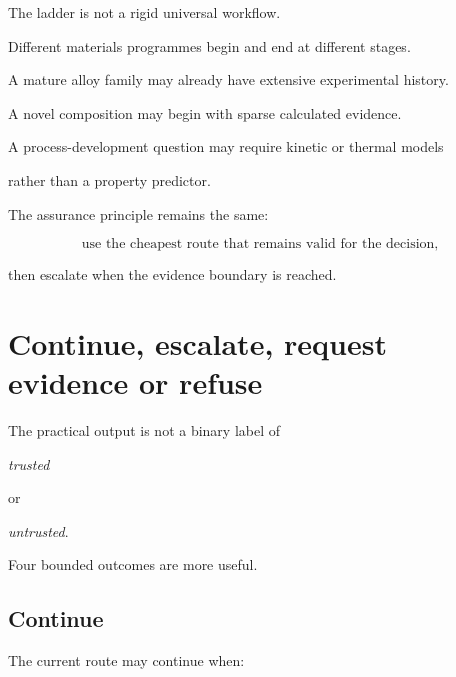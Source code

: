 \documentclass[11pt,a4paper,oneside]{report}
\begin{document}
The ladder is not a rigid universal workflow.



Different materials programmes begin and end at different stages.



A mature alloy family may already have extensive experimental history.



A novel composition may begin with sparse calculated evidence.



A process-development question may require kinetic or thermal models

rather than a property predictor.



The assurance principle remains the same:



\begin{equation}
\text{use the cheapest route that remains valid for the decision,}
\end{equation}



then escalate when the evidence boundary is reached.





\section{Continue, escalate, request evidence or refuse}



The practical output is not a binary label of

\emph{trusted}

or

\emph{untrusted}.



Four bounded outcomes are more useful.



\subsection{Continue}



The current route may continue when:
\end{document}
